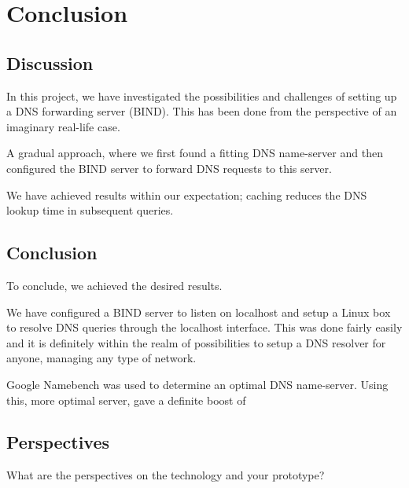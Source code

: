 \chapter{Conclusion}
\section{Discussion}
In this project, we have investigated the possibilities and challenges of setting up a DNS forwarding server (BIND). This has been done from the perspective of an imaginary real-life case. 

A gradual approach, where we first found a fitting DNS name-server and then configured the BIND server to forward DNS requests to this server. 

We have achieved results within our expectation; caching reduces the DNS lookup time in subsequent queries. 

\section{Conclusion}
To conclude, we achieved the desired results. 

We have configured a BIND server to listen on localhost and setup a Linux box to resolve DNS queries through the localhost interface. 
This was done fairly easily and it is definitely within the realm of possibilities to setup a DNS resolver for anyone, managing any type of network. 

Google Namebench was used to determine an optimal DNS name-server. Using this, more optimal server, gave a definite boost of 

\section{Perspectives}
What are the perspectives on the technology and your prototype? 
